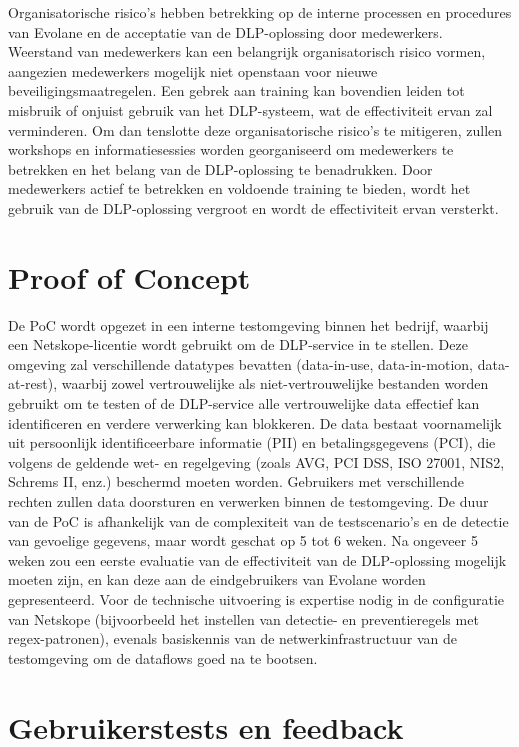 Organisatorische risico's hebben betrekking op de interne processen en procedures van Evolane en de acceptatie van de DLP-oplossing door medewerkers. 
Weerstand van medewerkers kan een belangrijk organisatorisch risico vormen, aangezien medewerkers mogelijk niet openstaan voor nieuwe beveiligingsmaatregelen. 
Een gebrek aan training kan bovendien leiden tot misbruik of onjuist gebruik van het DLP-systeem, wat de effectiviteit ervan zal verminderen. 
Om dan tenslotte deze organisatorische risico's te mitigeren, zullen workshops en informatiesessies worden georganiseerd om medewerkers te betrekken en het belang van de DLP-oplossing te benadrukken. 
Door medewerkers actief te betrekken en voldoende training te bieden, wordt het gebruik van de DLP-oplossing vergroot en wordt de effectiviteit ervan versterkt.

\section{Proof of Concept}%

De PoC wordt opgezet in een interne testomgeving binnen het bedrijf, waarbij een Netskope-licentie wordt gebruikt om de DLP-service in te stellen. 
Deze omgeving zal verschillende datatypes bevatten (data-in-use, data-in-motion, data-at-rest), 
waarbij zowel vertrouwelijke als niet\--vertr\-ouwelijke bestanden worden gebruikt om te testen of de DLP-service alle vertrouwelijke data effectief kan identificeren en verdere verwerking kan blokkeren. 
De data bestaat voornamelijk uit persoonlijk identificeerbare informatie (PII) en betalingsgegevens (PCI), die volgens de geldende wet- en regelgeving (zoals AVG, PCI DSS, ISO 27001, NIS2, Schrems II, enz.) beschermd moeten worden. 
Gebruikers met verschillende rechten zullen data doorsturen en verwerken binnen de testomgeving. 
De duur van de PoC is afhankelijk van de complexiteit van de testscenario's en de detectie van gevoelige gegevens, 
maar wordt geschat op 5 tot 6 weken. 
Na ongeveer 5 weken zou een eerste evaluatie van de effectiviteit van de DLP-oplossing mogelijk moeten zijn, 
en kan deze aan de eindgebruikers van Evolane worden gepresenteerd. 
Voor de technische uitvoering is expertise nodig in de configuratie van Netskope (bijvoorbeeld het instellen van detectie- en preventieregels met regex-patronen), 
evenals basiskennis van de netwerkinfrastructuur van de testomgeving om de dataflows goed na te bootsen.

\section{Gebruikerstests en feedback}%

